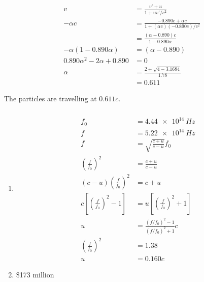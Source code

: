 \documentclass{article}
\begin{document}
\begin{align*}
  v                                 & = \frac{v' + u}{1 + u v' / c^2}                               \\
  -\alpha c                         & = \frac{-0.890 c + \alpha c}{1 + (\alpha c) (-0.890 c) / c^2} \\
                                    & = \frac{(\alpha - 0.890) c}{1 - 0.890 \alpha}                 \\
  -\alpha (1 - 0.890 \alpha)        & = (\alpha - 0.890)                                            \\
  0.890 \alpha^2 - 2 \alpha + 0.890 & = 0                                                           \\
  \alpha                            & = \frac{2 \pm \sqrt{4 - 3.1684}}{1.78}                        \\
                                    & = 0.611
\end{align*}

The particles are travelling at $0.611 c$.

\setcounter{subsubsection}{22}
\subsubsection{}

\begin{enumerate}
  \item

        \begin{align*}
          f_0                                                 & = \qty{4.44e14}{Hz}                                   \\
          f                                                   & = \qty{5.22e14}{Hz}                                   \\
          f                                                   & = \sqrt{\frac{c + u}{c - u}} f_0                      \\
          \left( \frac{f}{f_0} \right)^2                      & = \frac{c + u}{c - u}                                 \\
          (c - u) \left( \frac{f}{f_0} \right)^2              & = c + u                                               \\
          c \left[ \left( \frac{f}{f_0} \right)^2 - 1 \right] & = u \left[ \left( \frac{f}{f_0} \right)^2 + 1 \right] \\
          u                                                   & = \frac{(f / f_0)^2 - 1}{(f / f_0)^2 + 1} c           \\
          \left( \frac{f}{f_0} \right)^2                      & = 1.38                                                \\
          u                                                   & = 0.160 c
        \end{align*}

  \item \$173 million
\end{enumerate}
\end{document}
